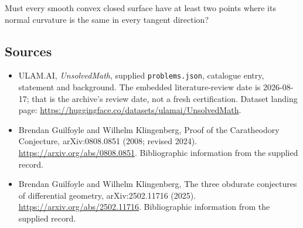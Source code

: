 \documentclass[11pt,a4paper]{article}
\begin{document}
Must every smooth convex closed surface have at least two points where its normal curvature is the same in every tangent direction?

\subsection{Sources}

{\small

\begin{itemize}

\item[\hypertarget{source:statement:1}{S1}] ULAM.AI, \emph{UnsolvedMath}, supplied \texttt{problems.json}, catalogue entry, statement and background. The embedded literature-review date is 2026-08-17; that is the archive’s review date, not a fresh certification. Dataset landing page: \url{https://huggingface.co/datasets/ulamai/UnsolvedMath}.

\item[\hypertarget{source:statement:2}{S2}] Brendan Guilfoyle and Wilhelm Klingenberg, Proof of the Caratheodory Conjecture, arXiv:0808.0851 (2008; revised 2024). \url{https://arxiv.org/abs/0808.0851}. Bibliographic information from the supplied record.

\item[\hypertarget{source:statement:3}{S3}] Brendan Guilfoyle and Wilhelm Klingenberg, The three obdurate conjectures of differential geometry, arXiv:2502.11716 (2025). \url{https://arxiv.org/abs/2502.11716}. Bibliographic information from the supplied record.

\end{itemize}

}

\label{end:statement}
\end{document}
